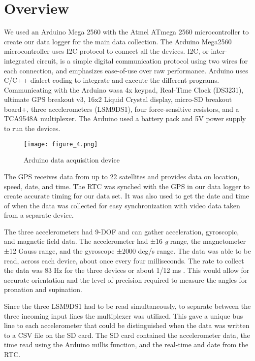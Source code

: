 \section{Overview}
We used an Arduino Mega 2560 with the Atmel ATmega 2560 microcontroller to create our data logger for the main data collection.
The Arduino Mega2560 microcontroller uses I2C protocol to connect all the devices.
I2C, or inter-integrated circuit, is a simple digital communication protocol using two wires for each connection, and emphasizes ease-of-use over raw performance.
Arduino uses C/C++ dialect coding to integrate and execute the different programs.
Communicating with the Arduino wasa  4x keypad, Real-Time Clock (DS3231), ultimate GPS breakout v3, 16x2 Liquid Crystal display, micro-SD breakout board+, three accelerometers (LSM9DS1), four force-sensitive resistors, and a TCA9548A multiplexer.
The Arduino used a battery pack and 5V power supply to run the devices.\par
\begin{figure}
  \centering
  \texttt{[image: figure\_4.png]}
  \caption[DAC]{Arduino data acquisition device}
  \label{fig:x dac}
\end{figure}
The GPS receives data from up to 22 satellites and provides data on location, speed, date, and time.
The RTC was synched with the GPS in our data logger to create accurate timing for our data set.
It was also used to get the date and time of when the data was collected for easy synchronization with video data taken from a separate device.\par
The three accelerometers had 9-DOF and can gather acceleration, gyroscopic, and magnetic field data.
The accelerometer had ±16 \textit{g} range, the magnetometer ±12 Gauss range, and the gyroscope ±2000 deg/s range.
The data was able to be read, across each device, about once every four milliseconds.
The rate to collect the data was 83 Hz for the three devices or about 1/12 ms \parencite{adafruit}.
This would allow for accurate orientation and the level of precision required to measure the angles for pronation and supination.\par
Since the three LSM9DS1 had to be read simultaneously, to separate between the three incoming input lines the multiplexer was utilized.
This gave a unique bus line to each accelerometer that could be distinguished when the data was written to a CSV file on the SD card.
The SD card contained the accelerometer data, the time read using the Arduino millis function, and the real-time and date from the RTC.

